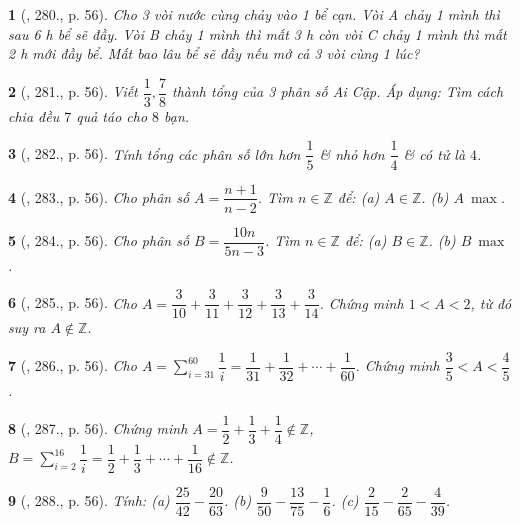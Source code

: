 \documentclass{article}
\newtheorem{baitoan}{}
\begin{document}
\begin{baitoan}[\cite{Tuyen_Toan_6}, 280., p. 56]
	Cho 3 vòi nước cùng chảy vào 1 bể cạn. Vòi A chảy 1 mình thì sau {\rm6 h} bể sẽ đầy. Vòi B chảy 1 mình thì mất {\rm3 h} còn vòi C chảy 1 mình thì mất {\rm2 h} mới đầy bể. Mất bao lâu bể sẽ đầy nếu mở cả 3 vòi cùng 1 lúc?
\end{baitoan}

\begin{baitoan}[\cite{Tuyen_Toan_6}, 281., p. 56]
	Viết $\dfrac{1}{3},\dfrac{7}{8}$ thành tổng của 3 phân số Ai Cập. Áp dụng: Tìm cách chia đều $7$ quả táo cho $8$ bạn.
\end{baitoan}

\begin{baitoan}[\cite{Tuyen_Toan_6}, 282., p. 56]
	Tính tổng các phân số lớn hơn $\dfrac{1}{5}$ \& nhỏ hơn $\dfrac{1}{4}$ \& có tử là $4$.
\end{baitoan}

\begin{baitoan}[\cite{Tuyen_Toan_6}, 283., p. 56]
	Cho phân số $A = \dfrac{n + 1}{n - 2}$. Tìm $n\in\mathbb{Z}$ để: (a) $A\in\mathbb{Z}$. (b) $A\ \max$.
\end{baitoan}

\begin{baitoan}[\cite{Tuyen_Toan_6}, 284., p. 56]
	Cho phân số $B = \dfrac{10n}{5n - 3}$. Tìm $n\in\mathbb{Z}$ để: (a) $B\in\mathbb{Z}$. (b) $B\ \max$.
\end{baitoan}

\begin{baitoan}[\cite{Tuyen_Toan_6}, 285., p. 56]
	Cho $A = \dfrac{3}{10} + \dfrac{3}{11} + \dfrac{3}{12} + \dfrac{3}{13} + \dfrac{3}{14}$. Chứng minh $1 < A < 2$, từ đó suy ra $A\notin\mathbb{Z}$.
\end{baitoan}

\begin{baitoan}[\cite{Tuyen_Toan_6}, 286., p. 56]
	Cho $A = \sum_{i=31}^{60} \dfrac{1}{i} = \dfrac{1}{31} + \dfrac{1}{32} + \cdots + \dfrac{1}{60}$. Chứng minh $\dfrac{3}{5} < A < \dfrac{4}{5}$.
\end{baitoan}

\begin{baitoan}[\cite{Tuyen_Toan_6}, 287., p. 56]
	Chứng minh $A = \dfrac{1}{2} + \dfrac{1}{3} + \dfrac{1}{4}\notin\mathbb{Z}$, $B = \sum_{i=2}^{16} \dfrac{1}{i} = \dfrac{1}{2} + \dfrac{1}{3} + \cdots + \dfrac{1}{16}\notin\mathbb{Z}$.
\end{baitoan}

\begin{baitoan}[\cite{Tuyen_Toan_6}, 288., p. 56]
	Tính: (a) $\dfrac{25}{42} - \dfrac{20}{63}$. (b) $\dfrac{9}{50} - \dfrac{13}{75} - \dfrac{1}{6}$. (c) $\dfrac{2}{15} - \dfrac{2}{65} - \dfrac{4}{39}$.
\end{baitoan}
\end{document}
